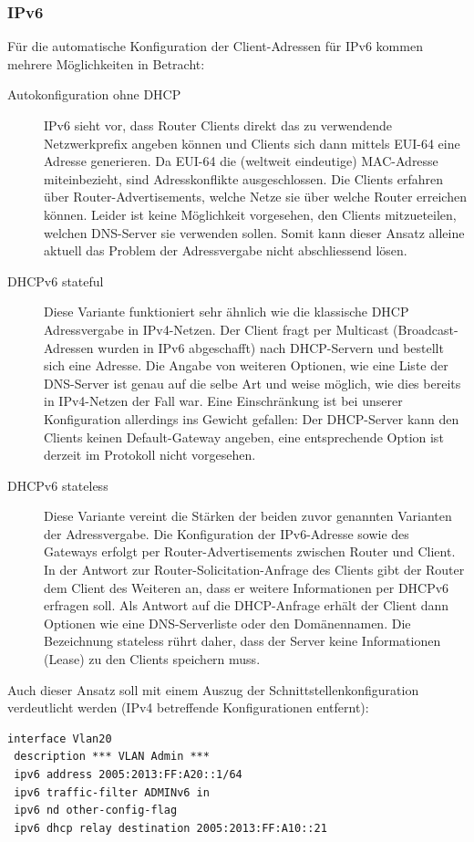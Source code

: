 \documentclass[11pt,a4paper,parskip=half]{scrartcl}
\begin{document}
\subsubsection{IPv6}
Für die automatische Konfiguration der Client-Adressen für IPv6 kommen mehrere Möglichkeiten in Betracht:
\begin{description}
	\item[Autokonfiguration ohne DHCP] IPv6 sieht vor, dass Router Clients direkt das zu verwendende Netzwerkprefix angeben können und Clients sich dann mittels EUI-64 eine Adresse generieren. Da EUI-64 die (weltweit eindeutige) MAC-Adresse miteinbezieht, sind Adresskonflikte ausgeschlossen. Die Clients erfahren über Router-Advertisements, welche Netze sie über welche Router erreichen können.
		Leider ist keine Möglichkeit vorgesehen, den Clients mitzueteilen, welchen DNS-Server sie verwenden sollen. Somit kann dieser Ansatz alleine aktuell das Problem der Adressvergabe nicht abschliessend lösen.
	\item[DHCPv6 stateful] Diese Variante funktioniert sehr ähnlich wie die klassische DHCP Adressvergabe in IPv4-Netzen. Der Client fragt per Multicast (Broadcast-Adressen wurden in IPv6 abgeschafft) nach DHCP-Servern und \glqq{}bestellt\grqq{} sich eine Adresse. Die Angabe von weiteren Optionen, wie eine Liste der DNS-Server ist genau auf die selbe Art und weise möglich, wie dies bereits in IPv4-Netzen der Fall war. Eine Einschränkung ist bei unserer Konfiguration allerdings ins Gewicht gefallen: Der DHCP-Server kann den Clients keinen Default-Gateway angeben, eine entsprechende Option ist derzeit im Protokoll nicht vorgesehen.
	\item[DHCPv6 stateless] Diese Variante vereint die Stärken der beiden zuvor genannten Varianten der Adressvergabe. Die Konfiguration der IPv6-Adresse sowie des Gateways erfolgt per Router-Advertisements zwischen Router und Client. In der Antwort zur Router-Solicitation-Anfrage des Clients gibt der Router dem Client des Weiteren an, dass er weitere Informationen per DHCPv6 erfragen soll. Als Antwort auf die DHCP-Anfrage erhält der Client dann Optionen wie eine DNS-Serverliste oder den Domänennamen. Die Bezeichnung \glqq{}stateless\grqq{} rührt daher, dass der Server keine Informationen (Lease) zu den Clients speichern muss.
\end{description}

Auch dieser Ansatz soll mit einem Auszug der Schnittstellenkonfiguration verdeutlicht werden (IPv4 betreffende Konfigurationen entfernt):
\begin{lstlisting}
interface Vlan20
 description *** VLAN Admin ***
 ipv6 address 2005:2013:FF:A20::1/64
 ipv6 traffic-filter ADMINv6 in
 ipv6 nd other-config-flag
 ipv6 dhcp relay destination 2005:2013:FF:A10::21
\end{lstlisting}
\end{document}
